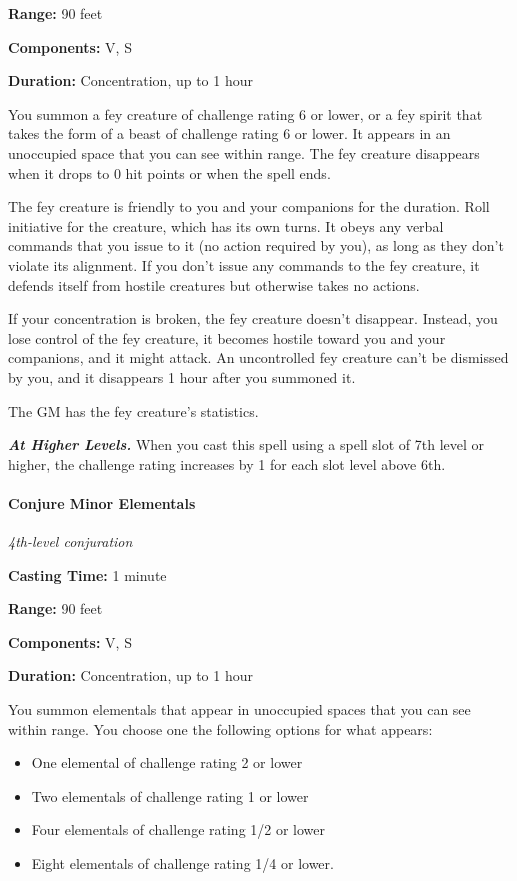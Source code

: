 \documentclass[
]{article}
\providecommand{\tightlist}{%
  \setlength{\itemsep}{0pt}\setlength{\parskip}{0pt}}
\begin{document}
\textbf{Range:} 90 feet

\textbf{Components:} V, S

\textbf{Duration:} Concentration, up to 1 hour

You summon a fey creature of challenge rating 6 or lower, or a fey
spirit that takes the form of a beast of challenge rating 6 or lower. It
appears in an unoccupied space that you can see within range. The fey
creature disappears when it drops to 0 hit points or when the spell
ends.

The fey creature is friendly to you and your companions for the
duration. Roll initiative for the creature, which has its own turns. It
obeys any verbal commands that you issue to it (no action required by
you), as long as they don't violate its alignment. If you don't issue
any commands to the fey creature, it defends itself from hostile
creatures but otherwise takes no actions.

If your concentration is broken, the fey creature doesn't disappear.
Instead, you lose control of the fey creature, it becomes hostile toward
you and your companions, and it might attack. An uncontrolled fey
creature can't be dismissed by you, and it disappears 1 hour after you
summoned it.

The GM has the fey creature's statistics.

\emph{\textbf{At Higher Levels.}} When you cast this spell using a spell
slot of 7th level or higher, the challenge rating increases by 1 for
each slot level above 6th.

\hypertarget{conjure-minor-elementals}{%
\paragraph{Conjure Minor Elementals}\label{conjure-minor-elementals}}

\emph{4th-level conjuration}

\textbf{Casting Time:} 1 minute

\textbf{Range:} 90 feet

\textbf{Components:} V, S

\textbf{Duration:} Concentration, up to 1 hour

You summon elementals that appear in unoccupied spaces that you can see
within range. You choose one the following options for what appears:

\begin{itemize}
\tightlist
\item
  One elemental of challenge rating 2 or lower
\item
  Two elementals of challenge rating 1 or lower
\item
  Four elementals of challenge rating 1/2 or lower
\item
  Eight elementals of challenge rating 1/4 or lower.
\end{itemize}
\end{document}
